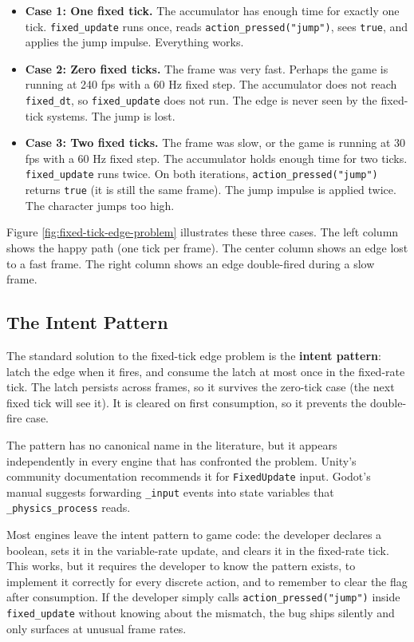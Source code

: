 \documentclass[
  11pt,
  letterpaper,
  DIV=11,
  numbers=noendperiod,
  twoside,
  open=right]{scrreprt}
\begin{document}
\begin{itemize}
\item
  \textbf{Case 1: One fixed tick.} The accumulator has enough time for
  exactly one tick. \texttt{fixed\_update} runs once, reads
  \texttt{action\_pressed("jump")}, sees \texttt{true}, and applies the
  jump impulse. Everything works.
\item
  \textbf{Case 2: Zero fixed ticks.} The frame was very fast. Perhaps
  the game is running at 240 fps with a 60 Hz fixed step. The
  accumulator does not reach \texttt{fixed\_dt}, so
  \texttt{fixed\_update} does not run. The edge is never seen by the
  fixed-tick systems. The jump is lost.
\item
  \textbf{Case 3: Two fixed ticks.} The frame was slow, or the game is
  running at 30 fps with a 60 Hz fixed step. The accumulator holds
  enough time for two ticks. \texttt{fixed\_update} runs twice. On both
  iterations, \texttt{action\_pressed("jump")} returns \texttt{true} (it
  is still the same frame). The jump impulse is applied twice. The
  character jumps too high.
\end{itemize}

Figure \ref{fig:fixed-tick-edge-problem} illustrates these three cases.
The left column shows the happy path (one tick per frame). The center
column shows an edge lost to a fast frame. The right column shows an
edge double-fired during a slow frame.



\subsection{The Intent Pattern}\label{the-intent-pattern}

The standard solution to the fixed-tick edge problem is the
\textbf{intent pattern}: latch the edge when it fires, and consume the
latch at most once in the fixed-rate tick. The latch persists across
frames, so it survives the zero-tick case (the next fixed tick will see
it). It is cleared on first consumption, so it prevents the double-fire
case.

The pattern has no canonical name in the literature, but it appears
independently in every engine that has confronted the problem. Unity's
community documentation recommends it for \texttt{FixedUpdate} input.
Godot's manual suggests forwarding \texttt{\_input} events into state
variables that \texttt{\_physics\_process} reads.

Most engines leave the intent pattern to game code: the developer
declares a boolean, sets it in the variable-rate update, and clears it
in the fixed-rate tick. This works, but it requires the developer to
know the pattern exists, to implement it correctly for every discrete
action, and to remember to clear the flag after consumption. If the
developer simply calls \texttt{action\_pressed("jump")} inside
\texttt{fixed\_update} without knowing about the mismatch, the bug ships
silently and only surfaces at unusual frame rates.
\end{document}
